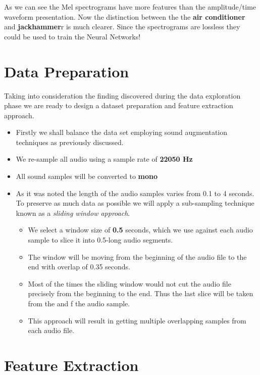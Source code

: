 As we can see the Mel spectrograms have more features than the
amplitude/time waveform presentation. Now the distinction between the
the \textbf{air conditioner} and \textbf{jackhammer}r is much clearer.
Since the spectrograms are lossless they could be used to train the
Neural Networks!

\hypertarget{data-preparation}{%
\section{Data Preparation}\label{data-preparation}}

Taking into consideration the finding discovered during the data
exploration phase we are ready to design a dataset preparation and
feature extraction approach.

\begin{itemize}
\item
  Firstly we shall balance the data set employing sound augmentation
  techniques as previously discussed.
\item
  We re-sample all audio using a sample rate of \textbf{22050 Hz}
\item
  All sound samples will be converted to \textbf{mono}
\item
  As it was noted the length of the audio samples varies from 0.1 to 4
  seconds. To preserve as much data as possible we will apply a
  sub-sampling technique known as a \emph{sliding window approach}.

  \begin{itemize}
  \tightlist
  \item
    We select a window size of \textbf{0.5} seconds, which we use
    against each audio sample to slice it into 0.5-long audio segments.
  \item
    The window will be moving from the beginning of the audio file to
    the end with overlap of 0.35 seconds.
  \item
    Most of the times the sliding window would not cut the audio file
    precisely from the beginning to the end. Thus the last slice will be
    taken from the and f the audio sample.
  \item
    This approach will result in getting multiple overlapping samples
    from each audio file.
  \end{itemize}
\end{itemize}

\hypertarget{feature-extraction}{%
\section{Feature Extraction}\label{feature-extraction}}

